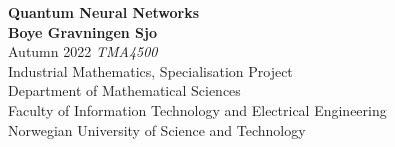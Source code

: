 \begin{titlepage}
    \begin{center}
        \vspace*{1cm}
        \Huge
        \textbf{
            Quantum Neural Networks}\\

        \large
        \vspace{1.5cm}
        \textbf{Boye Gravningen Sjo}\\
        \vspace{0.5cm}
        Autumn 2022
        \vspace{0.5cm}
        \vfill
        \textit{TMA4500} \\[0.3cm]
        Industrial Mathematics, Specialisation Project \\[0.3cm]
        Department of Mathematical Sciences \\[0.3cm]
        Faculty of Information Technology and Electrical Engineering \\[0.3cm]
        Norwegian University of Science and Technology
    \end{center}
\end{titlepage}
\thispagestyle{empty}
\cleardoublepage